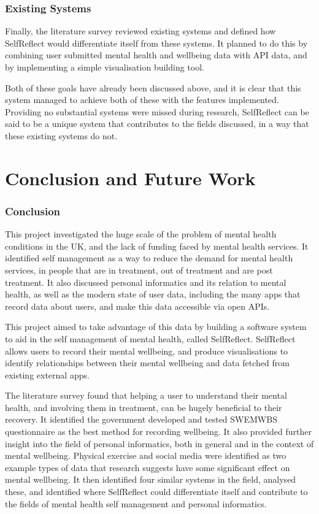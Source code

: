 \documentclass[11pt,openright,a4paper]{report}
\begin{document}
\subsection{Existing Systems}
Finally, the literature survey reviewed existing systems and defined how SelfReflect would differentiate itself from these systems. It planned to do this by combining user submitted mental health and wellbeing data with API data, and by implementing a simple visualisation building tool.

Both of these goals have already been discussed above, and it is clear that this system managed to achieve both of these with the features implemented. Providing no substantial systems were missed during research, SelfReflect can be said to be a unique system that contributes to the fields discussed, in a way that these existing systems do not.

\chapter{Conclusion and Future Work} \label{chap:conc}
\subsection{Conclusion}
This project investigated the huge scale of the problem of mental health conditions in the UK, and the lack of funding faced by mental health services. It identified self management as a way to reduce the demand for mental health services, in people that are in treatment, out of treatment and are post treatment. It also discussed personal informatics and its relation to mental health, as well as the modern state of user data, including the many apps that record data about users, and make this data accessible via open APIs.

This project aimed to take advantage of this data by building a software system to aid in the self management of mental health, called SelfReflect. SelfReflect allows users to record their mental wellbeing, and produce visualisations to identify relationships between their mental wellbeing and data fetched from existing external apps.

The literature survey found that helping a user to understand their mental health, and involving them in treatment, can be hugely beneficial to their recovery. It identified the government developed and tested SWEMWBS questionnaire as the best method for recording wellbeing. It also provided further insight into the field of personal informatics, both in general and in the context of mental wellbeing. Physical exercise and social media were identified as two example types of data that research suggests have some significant effect on mental wellbeing. It then identified four similar systems in the field, analysed these, and identified where SelfReflect could differentiate itself and contribute to the fields of mental health self management and personal informatics.
\end{document}
